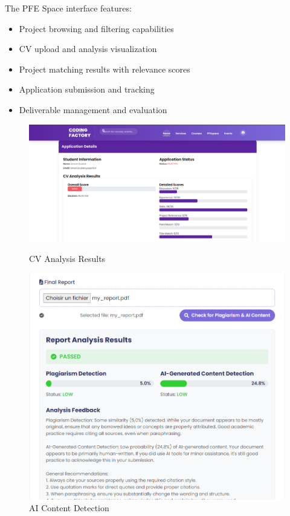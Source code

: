 \documentclass[12pt,a4paper]{report}
\begin{document}
The PFE Space interface features:

\begin{itemize}
    \item Project browsing and filtering capabilities
    \item CV upload and analysis visualization
    \item Project matching results with relevance scores
    \item Application submission and tracking
    \item Deliverable management and evaluation
\end{itemize}

\begin{figure}[!htbp]
\centering
\begin{minipage}{0.45\textwidth}
    \centering
    \includegraphics[width=\textwidth]{media/cv analysis.png}
    \caption{CV Analysis Results}
    \label{fig:cv-analysis}
\end{minipage}
\hfill
\begin{minipage}{0.45\textwidth}
    \centering
    \includegraphics[width=\textwidth]{media/plagiat.png}
    \caption{AI Content Detection}
    \label{fig:plagiarism}
\end{minipage}
\end{figure}
\end{document}
